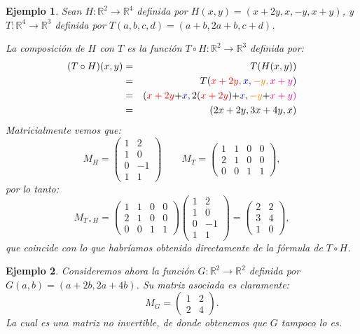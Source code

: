 \documentclass[12pt]{book}
\newtheorem{ejem}{Ejemplo}
\def\R{\mathbb{R}}
\begin{document}
\begin{ejem}
  Sean $H:\R^2\rightarrow \R^4$ definida por $H(x,y)=(x+2y,x,-y,x+y)$, y $T:\R^4\rightarrow \R^3$ definida por $T(a,b,c,d)=(a+b,2a+b,c+d)$.

  {\em La composición de $H$ con $T$ es la función $T\circ H:\R^2\rightarrow \R^3$ definida por:
  \begin{eqnarray*}
    (T\circ H)(x,y)&=&T(H(x,y))\\
    &=&T(\color{red}{x+2y},\color{blue}{x},\color{orange}{-y},\color{magenta}{x+y}\color{black}{)}\\
    &=&(\color{red}{x+2y}\color{black}{+}\color{blue}{x},\color{black}{2(}\color{red}{x+2y}\color{black}{)+}\color{blue}{x},\color{orange}{-y}\color{black}{+}\color{magenta}{x+y})\\
    &=&(2x+2y,3x+4y,x)
  \end{eqnarray*}
  Matricialmente vemos que:
  \[
    M_H=\left(\begin{array}{rr}1&2\\1&0\\0&-1\\1&1\end{array}\right)\qquad
    M_T=\left(\begin{array}{rrrr}1&1&0&0\\2&1&0&0\\0&0&1&1\end{array}\right),
  \]
  por lo tanto:
  \[
  M_{T\circ H}=\left(\begin{array}{rrrr}1&1&0&0\\2&1&0&0\\0&0&1&1\end{array}\right)
    \left(\begin{array}{rr}1&2\\1&0\\0&-1\\1&1\end{array}\right)
      =\left(\begin{array}{rr}2&2\\3&4\\1&0\end{array}\right),
        \]
  que coincide con lo que habríamos obtenido directamente de la fórmula de $T\circ H$.}
\end{ejem}

\begin{ejem}
  Consideremos ahora la función $G:\R^2\rightarrow\R^2$ definida por $G(a,b)=(a+2b,2a+4b)$.
  Su matriz asociada es claramente:
  $$M_G=\left(\begin{array}{rr}1&2\\2&4\end{array}\right).$$
  La cual es una matriz no invertible, de donde obtenemos que $G$ tampoco lo es.
\end{ejem}
  
\end{document}
